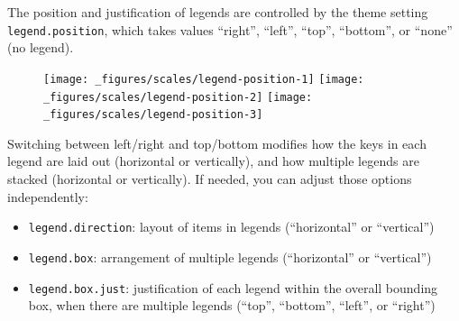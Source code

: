 The position and justification of legends are controlled by the theme
setting \texttt{legend.position}, which takes values ``right'',
``left'', ``top'', ``bottom'', or ``none'' (no legend).

\begin{Shaded}
\begin{Highlighting}[]
\StringTok{ }\NormalTok{(} \NormalTok{:}\NormalTok{, } \NormalTok{:}\NormalTok{, } \NormalTok{(}\NormalTok{, }\NormalTok{, }\NormalTok{))}
\StringTok{ }\StringTok{ }
\StringTok{  }\NormalTok{(}\NormalTok{(}  \NormalTok{) +}\StringTok{ }
\StringTok{  }\NormalTok{(}\NormalTok{) +}\StringTok{ }
\StringTok{  }\NormalTok{(}\NormalTok{)}

\StringTok{ }\NormalTok{(} \NormalTok{) }
\StringTok{ }\NormalTok{(} \NormalTok{)}
\StringTok{ }\NormalTok{(} \NormalTok{)}
\end{Highlighting}
\end{Shaded}

\begin{figure}[H]
  \texttt{[image: \_figures/scales/legend-position-1]}%
  \texttt{[image: \_figures/scales/legend-position-2]}%
  \texttt{[image: \_figures/scales/legend-position-3]}
\end{figure}

Switching between left/right and top/bottom modifies how the keys in
each legend are laid out (horizontal or vertically), and how multiple
legends are stacked (horizontal or vertically). If needed, you can
adjust those options independently:

\begin{itemize}
\item
  \texttt{legend.direction}: layout of items in legends (``horizontal''
  or ``vertical'')
\item
  \texttt{legend.box}: arrangement of multiple legends (``horizontal''
  or ``vertical'')
\item
  \texttt{legend.box.just}: justification of each legend within the
  overall bounding box, when there are multiple legends (``top'',
  ``bottom'', ``left'', or ``right'')
\end{itemize}

